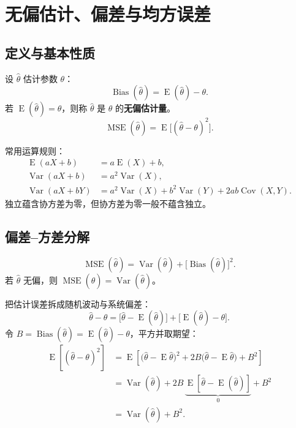 \documentclass[11pt,a4paper]{article}
\newcommand{\E}{\operatorname{E}}
\newcommand{\Var}{\operatorname{Var}}
\newcommand{\Cov}{\operatorname{Cov}}
\newcommand{\Bias}{\operatorname{Bias}}
\newcommand{\MSE}{\operatorname{MSE}}
\newcommand{\1}{\mathbf{1}}
\begin{document}
\section{无偏估计、偏差与均方误差}

\subsection{定义与基本性质}

\begin{memorybox}
设 $\hat\theta$ 估计参数 $\theta$：
\[
  \boxed{\Bias(\hat\theta)=\E(\hat\theta)-\theta.}
\]
若 $\E(\hat\theta)=\theta$，则称 $\hat\theta$ 是 $\theta$ 的\textbf{无偏估计量}。
\[
  \boxed{\MSE(\hat\theta)=\E\bigl[(\hat\theta-\theta)^2\bigr].}
\]
\end{memorybox}

常用运算规则：
\begin{align*}
  \E(aX+b)&=a\E(X)+b,\\
  \Var(aX+b)&=a^2\Var(X),\\
  \Var(aX+bY)&=a^2\Var(X)+b^2\Var(Y)+2ab\Cov(X,Y).
\end{align*}
独立蕴含协方差为零，但协方差为零一般不蕴含独立。

\subsection{偏差--方差分解}

\begin{memorybox}
\[
  \boxed{
  \MSE(\hat\theta)
  =
  \Var(\hat\theta)+\bigl[\Bias(\hat\theta)\bigr]^2.
  }
\]
若 $\hat\theta$ 无偏，则 $\MSE(\hat\theta)=\Var(\hat\theta)$。
\end{memorybox}

\begin{proofbox}[完整证明]
把估计误差拆成随机波动与系统偏差：
\[
  \hat\theta-\theta
  =
  \bigl[\hat\theta-\E(\hat\theta)\bigr]
  +
  \bigl[\E(\hat\theta)-\theta\bigr].
\]
令 $B=\Bias(\hat\theta)=\E(\hat\theta)-\theta$，平方并取期望：
\begin{align*}
  \E[(\hat\theta-\theta)^2]
  &=
  \E\left[
  \bigl(\hat\theta-\E\hat\theta\bigr)^2
  +2B\bigl(\hat\theta-\E\hat\theta\bigr)
  +B^2
  \right]\\
  &=
  \Var(\hat\theta)
  +2B\,\underbrace{\E[\hat\theta-\E(\hat\theta)]}_{0}
  +B^2\\
  &=\Var(\hat\theta)+B^2.
\end{align*}
\end{proofbox}
\end{document}
